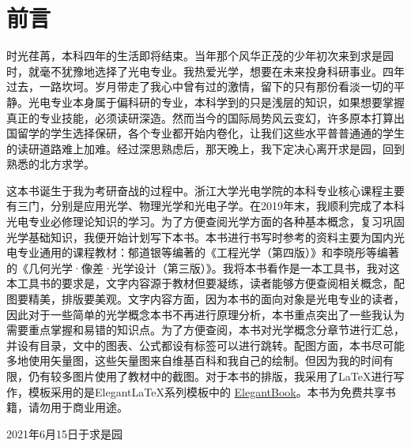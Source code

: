 \chapter*{前\hspace{1em}言}

时光荏苒，本科四年的生活即将结束。当年那个风华正茂的少年初次来到求是园时，就毫不犹豫地选择了光电专业。我热爱光学，想要在未来投身科研事业。四年过去，一路坎坷。岁月带走了我心中曾有过的激情，留下的只有那份看淡一切的平静。光电专业本身属于偏科研的专业，本科学到的只是浅层的知识，如果想要掌握真正的专业技能，必须读研深造。然而当今的国际局势风云变幻，许多原本打算出国留学的学生选择保研，各个专业都开始内卷化，让我们这些水平普普通通的学生的读研道路难上加难。经过深思熟虑后，那天晚上，我下定决心离开求是园，回到熟悉的北方求学。

这本书诞生于我为考研奋战的过程中。浙江大学光电学院的本科专业核心课程主要有三门，分别是应用光学、物理光学和光电子学。在2019年末，我顺利完成了本科光电专业必修理论知识的学习。为了方便查阅光学方面的各种基本概念，复习巩固光学基础知识，我便开始计划写下本书。本书进行书写时参考的资料主要为国内光电专业通用的课程教材：郁道银等编著的《工程光学（第四版）》和李晓彤等编著的《几何光学·像差·光学设计（第三版）》。我将本书看作是一本工具书，我对这本工具书的要求是，文字内容源于教材但要凝练，读者能够方便查阅相关概念，配图要精美，排版要美观。文字内容方面，因为本书的面向对象是光电专业的读者，因此对于一些简单的光学概念本书不再进行原理分析，本书重点突出了一些我认为需要重点掌握和易错的知识点。为了方便查阅，本书对光学概念分章节进行汇总，并设有目录，文中的图表、公式都设有标签可以进行跳转。配图方面，本书尽可能多地使用矢量图，这些矢量图来自维基百科和我自己的绘制。但因为我的时间有限，仍有较多图片使用了教材中的截图。对于本书的排版，我采用了\LaTeX 进行写作，模板采用的是Elegant\LaTeX 系列模板中的 \href{https://github.com/ElegantLaTeX/ElegantBook}{ElegantBook}。本书为免费共享书籍，请勿用于商业用途。

\begin{flushright}
	{}
	\par 2021年6月15日于求是园
\end{flushright}